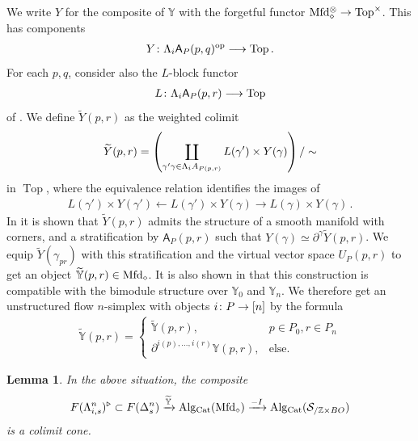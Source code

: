 \documentclass[10pt]{amsart}
\numberwithin{equation}{section}
\newtheorem{lem}[prop]{Lemma}
\theoremstyle{definition}
\DeclareMathOperator{\op}{op}
\DeclareMathOperator{\Top}{Top}
\newcommand{\Cat}{\mathrm{Cat}\vphantom{t}}
\newcommand{\Mfd}{\mathrm{Mfd}\vphantom{d}}
\newcommand{\Alg}{\mathrm{Alg}\vphantom{z}}
\newcommand{\bZ}{\mathbb{Z}}
\newcommand{\bY}{\mathbb{Y}}
\newcommand{\Horn}{\Lambda}
\newcommand{\cS}{\mathcal{S}}
\newcommand{\sfA}{\mathsf{A}}
\newcommand{\del}{\partial}
\renewcommand{\to}{\mathchoice{\longrightarrow}{\rightarrow}{}{}}
\begin{document}
We write $Y$ for the composite of $\bY$ with the forgetful functor $\Mfd_{\diamond}^{\otimes} \to \Top^{\times}$.
This has components
\begin{align*}
	Y \colon \Horn_{i}\sfA_{P}(p,q)^{\op} \to \Top.
\end{align*}
For each $p,q$, consider also the $L$-block functor
\begin{align*}
	L \colon \Horn_{i}\sfA_{P}(p,r) \to \Top
\end{align*}
of \cite[Equation 5.12]{AB}.
We define $\widetilde{Y}(p,r)$ as the weighted colimit
\begin{align*}
	\widetilde{Y}(p,r) = \left(\coprod_{\gamma'\to \gamma \in \Horn_{i}A_{P(p,r)}} L(\gamma') \times Y(\gamma) \right)/\sim
\end{align*}
in $\Top$, where the equivalence relation identifies the images of
\begin{align*}
	L(\gamma') \times Y(\gamma') \leftarrow L(\gamma') \times Y(\gamma) \rightarrow L(\gamma) \times Y(\gamma) \,.
\end{align*}
In \cite[Lemma 5.8]{AB} it is shown that $\widetilde{Y}(p,r)$ admits the structure of a smooth manifold with corners, and a stratification by $\sfA_{P}(p,r)$ such that $Y(\gamma) \simeq \del^{\gamma}\widetilde{Y}(p,r)$.
We equip $\widetilde{Y}(\gamma_{pr})$ with this stratification and the virtual vector space $U_{P}(p,r)$ to get an object $\widetilde{\bY}(p,r) \in \Mfd_{\diamond}$.
It is also shown in \cite[Corollary 5.10]{AB} that this construction is compatible with the bimodule structure over $\bY_{0}$ and $\bY_{n}$.
We therefore get an unstructured flow $n$-simplex with objects $i\colon P\to [n]$ by the formula
\begin{align*}
	\widetilde{\bY}(p,r) = \begin{cases}
		\widetilde{\bY}(p,r), & p\in P_0, r\in P_n \\
		\del^{i(p),\dots, i(r)} \bY(p,r), & \text{else.}
	\end{cases}
\end{align*}
\begin{lem}\label{lem:horn_filler_as_hocolim}
	In the above situation, the composite
	\begin{align}\label{eq:horn_filler_as_hocolim}
		F(\Horn^{n}_{i,s})^{\triangleright} \subset F(\Delta^{n}_{s}) \xrightarrow{\widetilde{\bY}} \Alg_{\Cat}(\Mfd_{\diamond}) \xrightarrow{-I} \Alg_{\Cat}(\cS_{/\bZ\times BO})
	\end{align}
	is a colimit cone.
\end{lem}
\end{document}
